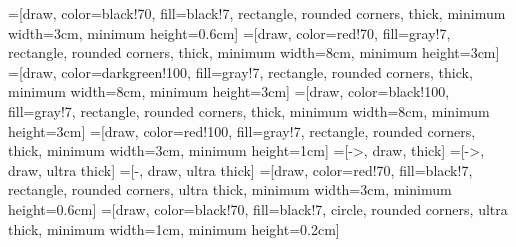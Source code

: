 
=[draw, color=black!70, fill=black!7, rectangle, rounded
corners, thick, minimum width=3cm, minimum height=0.6cm]
=[draw, color=red!70, fill=gray!7, rectangle, rounded
corners, thick, minimum width=8cm, minimum height=3cm]
=[draw, color=darkgreen!100, fill=gray!7, rectangle, rounded
corners, thick, minimum width=8cm, minimum height=3cm]
=[draw, color=black!100, fill=gray!7, rectangle, rounded
corners, thick, minimum width=8cm, minimum height=3cm]
=[draw, color=red!100, fill=gray!7, rectangle, rounded
corners, thick, minimum width=3cm, minimum height=1cm]
=[->, draw, thick]
=[->, draw, ultra thick]
=[-, draw, ultra thick]
=[draw, color=red!70, fill=black!7, rectangle, rounded
corners, ultra thick, minimum width=3cm, minimum height=0.6cm]
=[draw, color=black!70, fill=black!7, circle, rounded
corners, ultra thick, minimum width=1cm, minimum height=0.2cm]
\newcommand\framepicture[1]{
\begin{center}
		\begin{tikzpicture}
			\node[taskRect] at (0,3) {
			\begin{minipage}[t][4cm]{7cm}
		\texttt{[image: \#1]} 
		\end{minipage}
		};
	\end{tikzpicture}
\end{center}
}
\newcommand\drawDirectedGraph[2]{
\node[nUnit] (h) at (#2,#1) {h};
\node[nUnit] (v1) at (#2-1,#1-2) {v1};
\node[nUnit] (v2) at (#2+1,#1-2) {v2};
\draw[darrow] (v1) -- (h);
\draw[darrow] (v2) -- (h);
\draw[darrow] (h) -- (#2,#1+1);
}
\newcommand\drawUndirectedGraph[2]{
	\node[nUnit] (uh) at (#2,#1) {h};
	\node[nUnit] (uv1) at (#2-1,#1-2) {v1};
	\node[nUnit] (uv2) at (#2+1,#1-2) {v2};
	\draw[uarrow] (uv1) -- (uh);
	\draw[uarrow] (uv2) -- (uh);
}
\newcommand\drawRBM[2]{
	\node[nUnit] (uh0) at (#2-1.5,#1) {h0};
	\node[nUnit] (uh1) at (#2,#1) {h1};
	\node[nUnit] (uh2) at (#2+1.5,#1) {h2};
	\node[nUnit] (uv1) at (#2-1,#1-2) {v1};
	\node[nUnit] (uv2) at (#2+1,#1-2) {v2};
	\draw[uarrow] (uv1) -- (uh0);
	\draw[uarrow] (uv1) -- (uh1);
	\draw[uarrow] (uv1) -- (uh2);
	\draw[uarrow] (uv2) -- (uh0);
	\draw[uarrow] (uv2) -- (uh1);
	\draw[uarrow] (uv2) -- (uh2);
}
